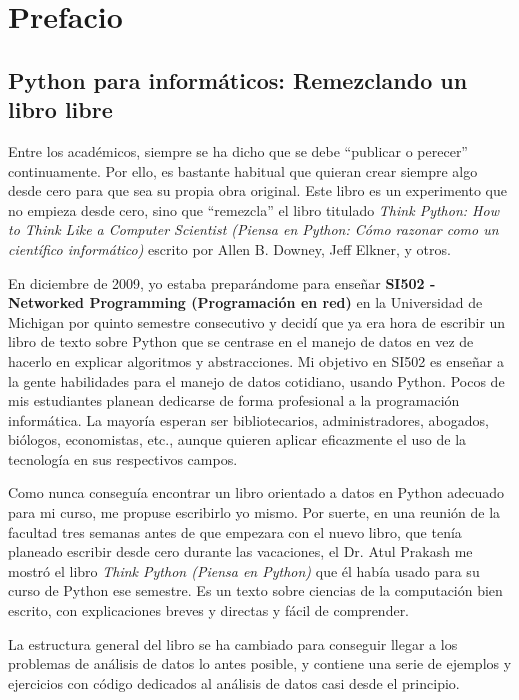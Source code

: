
\chapter{Prefacio}

\section*{Python para informáticos: Remezclando un libro libre}

Entre los académicos, siempre se ha dicho que se debe ``publicar o perecer''
continuamente. Por ello, es bastante habitual que quieran crear siempre algo desde cero
para que sea su propia obra original. Este libro es un
experimento que no empieza desde cero, sino que ``remezcla''
el libro titulado
\emph{Think Python: How to Think Like
a Computer Scientist (Piensa en Python: Cómo razonar como
un científico informático)}
escrito por Allen B. Downey, Jeff Elkner, y otros.

En diciembre de 2009, yo estaba preparándome para enseñar
{\bf SI502 - Networked Programming (Programación en red)}
en la Universidad de Michigan
por quinto semestre consecutivo y decidí que ya era hora
de escribir un libro de texto sobre Python que se centrase en el manejo de datos
en vez de hacerlo en explicar algoritmos y abstracciones.
Mi objetivo en SI502 es enseñar a la gente habilidades para
el manejo de datos cotidiano, usando Python.
Pocos de mis estudiantes planean dedicarse de forma profesional
a la programación informática. La mayoría esperan ser
bibliotecarios, administradores, abogados, biólogos, economistas, etc.,
aunque quieren aplicar eficazmente el uso de la tecnología en sus respectivos campos.

Como nunca conseguía encontrar un libro orientado a datos en Python
adecuado para mi curso, me propuse escribirlo yo mismo.
Por suerte, en una reunión de la facultad tres semanas
antes de que empezara con el nuevo libro, que tenía planeado
escribir desde cero durante las vacaciones,
el Dr. Atul Prakash me mostró el libro \emph{Think Python (Piensa en Python)}
que él había usado para su curso de Python ese semestre.
Es un texto sobre ciencias de la computación bien escrito,
con explicaciones breves y directas y fácil de comprender.

La estructura general del libro
se ha cambiado para conseguir llegar a los problemas de análisis de datos
lo antes posible, y contiene una serie de ejemplos y ejercicios
con código dedicados al análisis de datos casi desde el principio.

